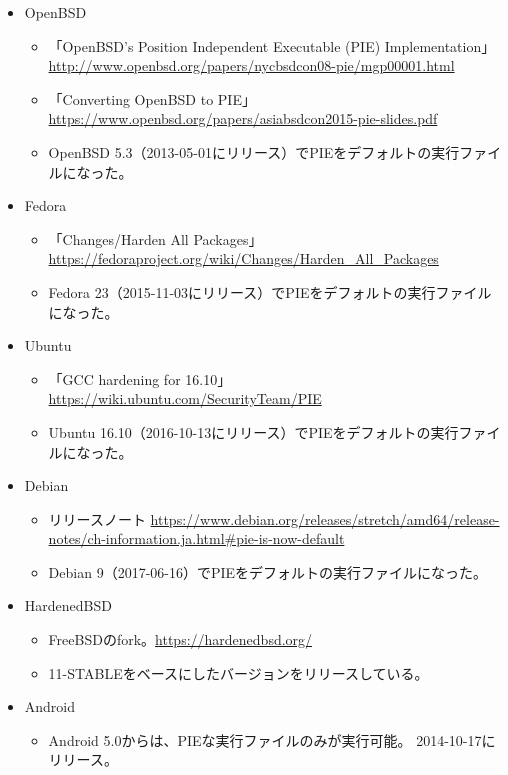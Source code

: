 \documentclass[mingoth,a4paper]{jsarticle}
\begin{document}
\begin{itemize}
\item OpenBSD
  \begin{itemize}
  \item 「OpenBSD's Position Independent Executable (PIE) Implementation」 \url{http://www.openbsd.org/papers/nycbsdcon08-pie/mgp00001.html}
  \item 「Converting OpenBSD to PIE」 \url{https://www.openbsd.org/papers/asiabsdcon2015-pie-slides.pdf}
  \item OpenBSD 5.3（2013-05-01にリリース）でPIEをデフォルトの実行ファイルになった。
  \end{itemize}
\item Fedora
  \begin{itemize}
  \item 「Changes/Harden All Packages」 \url{https://fedoraproject.org/wiki/Changes/Harden_All_Packages}
  \item Fedora 23（2015-11-03にリリース）でPIEをデフォルトの実行ファイルになった。
  \end{itemize}
\item Ubuntu
  \begin{itemize}
  \item 「GCC hardening for 16.10」 \url{https://wiki.ubuntu.com/SecurityTeam/PIE}
  \item Ubuntu 16.10（2016-10-13にリリース）でPIEをデフォルトの実行ファイルになった。
  \end{itemize}
\item Debian
  \begin{itemize}
  \item リリースノート \url{https://www.debian.org/releases/stretch/amd64/release-notes/ch-information.ja.html\#pie-is-now-default}
  \item Debian 9（2017-06-16）でPIEをデフォルトの実行ファイルになった。
  \end{itemize}
\item HardenedBSD 
  \begin{itemize}
  \item FreeBSDのfork。\url{https://hardenedbsd.org/}
  \item 11-STABLEをベースにしたバージョンをリリースしている。
  \end{itemize} 
\item Android
  \begin{itemize}
  \item Android 5.0からは、PIEな実行ファイルのみが実行可能。 2014-10-17にリリース。
  \end{itemize} 
\end{itemize}
\end{document}
